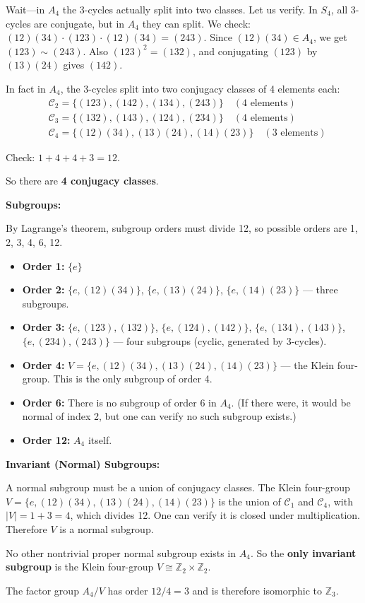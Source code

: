 \documentclass[12pt]{article}
\begin{document}
Wait---in $A_4$ the 3-cycles actually split into two classes. Let us verify. In $S_4$, all 3-cycles are conjugate, but in $A_4$ they can split. We check: $(12)(34) \cdot (123) \cdot (12)(34) = (243)$. Since $(12)(34) \in A_4$, we get $(123) \sim (243)$. Also $(123)^2 = (132)$, and conjugating $(123)$ by $(13)(24)$ gives $(142)$.

In fact in $A_4$, the 3-cycles split into two conjugacy classes of 4 elements each:
\begin{align*}
&\mathcal{C}_2 = \{(123), (142), (134), (243)\} \quad (4 \text{ elements}) \\
&\mathcal{C}_3 = \{(132), (143), (124), (234)\} \quad (4 \text{ elements}) \\
&\mathcal{C}_4 = \{(12)(34), (13)(24), (14)(23)\} \quad (3 \text{ elements})
\end{align*}

Check: $1 + 4 + 4 + 3 = 12$. \checkmark

So there are \textbf{4 conjugacy classes}.

\medskip
\noindent\textbf{Subgroups:}

By Lagrange's theorem, subgroup orders must divide 12, so possible orders are 1, 2, 3, 4, 6, 12.

\begin{itemize}
\item \textbf{Order 1:} $\{e\}$

\item \textbf{Order 2:} $\{e, (12)(34)\}$, $\{e, (13)(24)\}$, $\{e, (14)(23)\}$ --- three subgroups.

\item \textbf{Order 3:} $\{e, (123), (132)\}$, $\{e, (124), (142)\}$, $\{e, (134), (143)\}$, $\{e, (234), (243)\}$ --- four subgroups (cyclic, generated by 3-cycles).

\item \textbf{Order 4:} $V = \{e, (12)(34), (13)(24), (14)(23)\}$ --- the Klein four-group. This is the only subgroup of order 4.

\item \textbf{Order 6:} There is no subgroup of order 6 in $A_4$. (If there were, it would be normal of index 2, but one can verify no such subgroup exists.)

\item \textbf{Order 12:} $A_4$ itself.
\end{itemize}

\medskip
\noindent\textbf{Invariant (Normal) Subgroups:}

A normal subgroup must be a union of conjugacy classes. The Klein four-group $V = \{e, (12)(34), (13)(24), (14)(23)\}$ is the union of $\mathcal{C}_1$ and $\mathcal{C}_4$, with $|V| = 1 + 3 = 4$, which divides 12. One can verify it is closed under multiplication. Therefore $V$ is a normal subgroup.

No other nontrivial proper normal subgroup exists in $A_4$. So the \textbf{only invariant subgroup} is the Klein four-group $V \cong \mathbb{Z}_2 \times \mathbb{Z}_2$.

The factor group $A_4/V$ has order $12/4 = 3$ and is therefore isomorphic to $\mathbb{Z}_3$.
\end{document}
